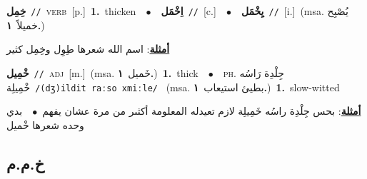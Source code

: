 \documentclass[10pt,a4paper,twoside]{article} %
\begin{document}
\begin{multicols}{2}
{\setlength\topsep{0pt}\textbf{\foreignlanguage{arabic}{خِمِل}}\ {\color{gray}\texttt{//}\color{black}}\ \textsc{verb}\ [p.]\ \textbf{1.}~thicken\ \ $\bullet$\ \ \setlength\topsep{0pt}\textbf{\foreignlanguage{arabic}{اِخْمَل}}\ {\color{gray}\texttt{//}\color{black}}\ [c.]\ \ $\bullet$\ \ \setlength\topsep{0pt}\textbf{\foreignlanguage{arabic}{يِخْمَل}}\ {\color{gray}\texttt{//}\color{black}}\ [i.]\ \color{gray}(msa. \foreignlanguage{arabic}{يُصْبِح خميلاً}~\foreignlanguage{arabic}{\textbf{١.}})\color{black}\  \begin{flushright}\color{gray}\foreignlanguage{arabic}{\textbf{\underline{\foreignlanguage{arabic}{أمثلة}}}: اسم الله شعرها طِوِل وخِمِل كثير}\end{flushright}\color{black}} \vspace{2mm}

{\setlength\topsep{0pt}\textbf{\foreignlanguage{arabic}{خْمِيل}}\ {\color{gray}\texttt{//}\color{black}}\ \textsc{adj}\ [m.]\ \color{gray}(msa. \foreignlanguage{arabic}{خَميل}~\foreignlanguage{arabic}{\textbf{١.}})\color{black}\ \textbf{1.}~thick\ \ $\bullet$\ \ \textsc{ph.} \color{gray} \foreignlanguage{arabic}{جِلْدِة رَاسُه خْمِيلِة}\color{black}\ {\color{gray}\texttt{/{\sffamily (dʒ)ildit raːso xmiːle}/}\color{black}}\ \color{gray} (msa. \foreignlanguage{arabic}{بطيئ استيعاب}~\foreignlanguage{arabic}{\textbf{١.}})\color{black}\ \textbf{1.}~slow-witted\  \begin{flushright}\color{gray}\foreignlanguage{arabic}{\textbf{\underline{\foreignlanguage{arabic}{أمثلة}}}: بحس جِلْدِة راسُه خَمِيلِة لازم تعيدله المعلومة أكثىر من مرة عشان يفهم\ $\bullet$\ \  بدي وحده شعرها خْميل}\end{flushright}\color{black}} \vspace{2mm}

\vspace{-3mm}
\subsection*{\color{blue}\foreignlanguage{arabic}{خ.م.م}\color{blue}{}} 


\end{multicols}
\end{document}
